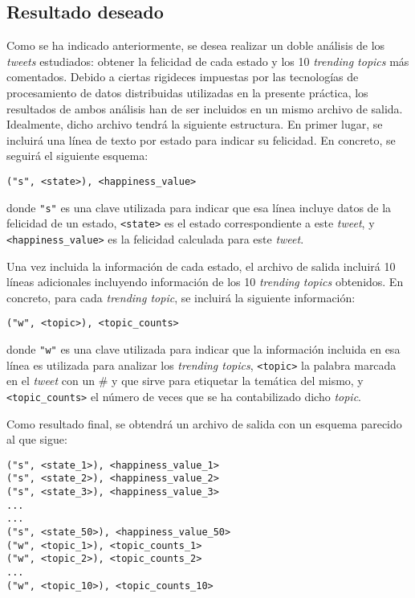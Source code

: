 \documentclass[10pt, spanish]{article}
\begin{document}
\subsection{Resultado deseado}

Como se ha indicado anteriormente, se desea realizar un doble análisis de los \textit{tweets} estudiados: obtener la felicidad de cada estado y los 10 \textit{trending topics} más comentados. Debido a ciertas rigideces impuestas por las tecnologías de procesamiento de datos distribuidas utilizadas en la presente práctica, los resultados de ambos análisis han de ser incluidos en un mismo archivo de salida. Idealmente, dicho archivo tendrá la siguiente estructura. En primer lugar, se incluirá una línea de texto por estado para indicar su felicidad. En concreto, se seguirá el siguiente esquema:

\texttt{("s", <state>), <happiness\_value>}

\noindent
donde \texttt{"s"} es una clave utilizada para indicar que esa línea incluye datos de la felicidad de un estado, \texttt{<state>} es el estado correspondiente a este \textit{tweet}, y \texttt{<happiness\_value>} es la felicidad calculada para este \textit{tweet}.

Una vez incluida la información de cada estado, el archivo de salida incluirá 10 líneas adicionales incluyendo información de los 10 \textit{trending topics} obtenidos. En concreto, para cada \textit{trending topic}, se incluirá la siguiente información:

\texttt{("w", <topic>), <topic\_counts>}

donde \texttt{"w"} es una clave utilizada para indicar que la información incluida en esa línea es utilizada para analizar los \textit{trending topics}, \texttt{<topic>} la palabra marcada en el \textit{tweet} con un \# y que sirve para etiquetar la temática del mismo, y \texttt{<topic\_counts>} el número de veces que se ha contabilizado dicho \textit{topic}.

Como resultado final, se obtendrá un archivo de salida con un esquema parecido al que sigue:

\texttt{("s", <state\_1>), <happiness\_value\_1>}\\
\texttt{("s", <state\_2>), <happiness\_value\_2>}\\
\texttt{("s", <state\_3>), <happiness\_value\_3>}\\
\texttt{...}\\
\texttt{...}\\
\texttt{("s", <state\_50>), <happiness\_value\_50>}\\
\texttt{("w", <topic\_1>), <topic\_counts\_1>}\\
\texttt{("w", <topic\_2>), <topic\_counts\_2>}\\
\texttt{...}\\
\texttt{("w", <topic\_10>), <topic\_counts\_10>}\\
\end{document}
